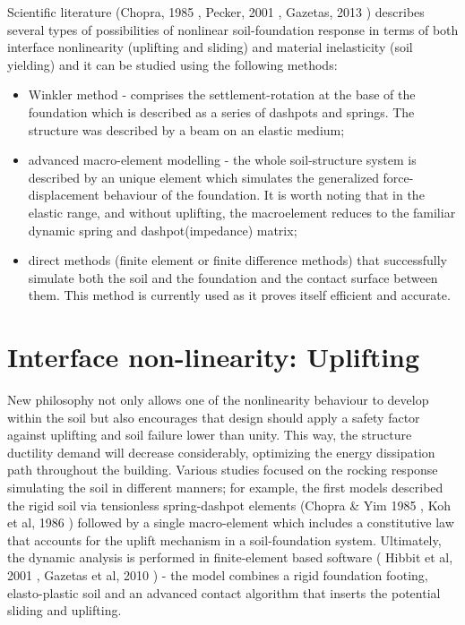 \documentclass[11pt,a4paper]{report}
\begin{document}
Scientific literature (Chopra, 1985 \cite{chopra1985simplified}, Pecker, 2001 \cite{cremer2001cyclic}, Gazetas, 2013 \cite{gazetas2013can}) describes several types of possibilities of nonlinear soil-foundation response in terms of both interface nonlinearity (uplifting and sliding) and material inelasticity (soil yielding) and it can be studied using the following methods:
\begin{itemize}
	\item 	Winkler method - comprises the settlement-rotation at the base of the foundation which is described as a series of dashpots and springs. The structure was described by a beam on an elastic medium;
	\item 	advanced macro-element modelling - the whole soil-structure system is described by an unique element which simulates the generalized force-displacement behaviour of the foundation. It is worth noting that in the elastic range, and without uplifting, the macroelement reduces to the familiar dynamic spring and dashpot(impedance) matrix;
	\item direct methods (finite element or finite difference methods) that successfully simulate both the soil and the foundation and the contact surface between them. This method is currently used as it proves itself efficient and accurate.
\end{itemize}

\section{Interface non-linearity: Uplifting}
New philosophy not only allows one of the nonlinearity behaviour to develop within the soil but also encourages that design should apply a safety factor against uplifting and soil \mbox{failure} lower than unity. This way, the structure ductility demand will decrease \mbox{considerably}, optimizing the energy dissipation path throughout the building. Various studies focused on the rocking response simulating the soil in different manners; for example, the first models described the rigid soil via tensionless spring-dashpot elements (Chopra \& Yim 1985 \cite{chopra1985simplified}, Koh et al, 1986 \cite{koh1986harmonic}) followed by a single macro-element which includes a constitutive law that accounts for the uplift mechanism in a soil-foundation system. Ultimately, the dynamic analysis is performed in finite-element based software ( Hibbit et al, 2001 \cite{hibbett1998abaqus}, Gazetas et al, 2010 \cite{anastasopoulos2010soil}) - the model combines a rigid foundation footing, elasto-plastic soil and an advanced contact algorithm that inserts the potential sliding and uplifting.
\end{document}
